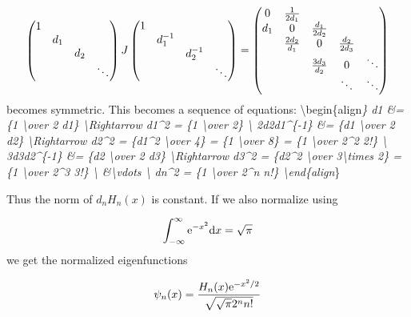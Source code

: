 \documentclass[12pt,a4paper]{article}
\def\D{ {\rm d} }
\def\E{ {\rm e} }
\def\dx{\D x}
\begin{document}
\[
\begin{pmatrix}1 \\ & d_1 \\ &&d_2 \\&&&\ddots \end{pmatrix}  J \begin{pmatrix}1 \\ & d_1^{-1} \\ &&d_2^{-1} \\&&&\ddots \end{pmatrix} = \begin{pmatrix} 0 & {1 \over 2d_1} \\ 
d_1 & 0 & {d_1 \over 2 d_2} \\
& {2d_2 \over d_1} & 0 & {d_2 \over 2 d_3} \\
&& {3d_3 \over d_2} & 0 & \ddots \\
&&& \ddots & \ddots
\end{pmatrix}
\]
becomes symmetric. This becomes a sequence of equations: {\textbackslash}begin\{align\emph{\} d\emph{1 \&= \{1 {\textbackslash}over 2 d}1\} {\textbackslash}Rightarrow d\emph{1\^{}2 = \{1 {\textbackslash}over 2\} {\textbackslash}
2d}2d\emph{1\^{}\{-1\} \&= \{d}1 {\textbackslash}over 2 d\emph{2\} {\textbackslash}Rightarrow d}2\^{}2 = \{d\emph{1\^{}2 {\textbackslash}over 4\} = \{1 {\textbackslash}over 8\} = \{1 {\textbackslash}over 2\^{}2 2!\} {\textbackslash}
3d}3d\emph{2\^{}\{-1\} \&= \{d}2 {\textbackslash}over 2 d\emph{3\} {\textbackslash}Rightarrow d}3\^{}2 = \{d\emph{2\^{}2 {\textbackslash}over 3{\textbackslash}times 2\} = \{1 {\textbackslash}over 2\^{}3 3!\} {\textbackslash}
\&{\textbackslash}vdots {\textbackslash}
d}n\^{}2 = \{1 {\textbackslash}over 2\^{}n n!\}  {\textbackslash}end\{align}\}

Thus the norm of $d_n H_n(x)$ is constant. If we also normalize using

\[
    \int_{-\infty}^\infty \E^{-x^2} \dx = \sqrt{\pi}
\]
we get the normalized eigenfunctions

\[
    \psi_n(x) = {H_n(x)\E^{-x^2/2}  \over \sqrt{\sqrt{\pi} 2^n n!} }
\]
\end{document}
